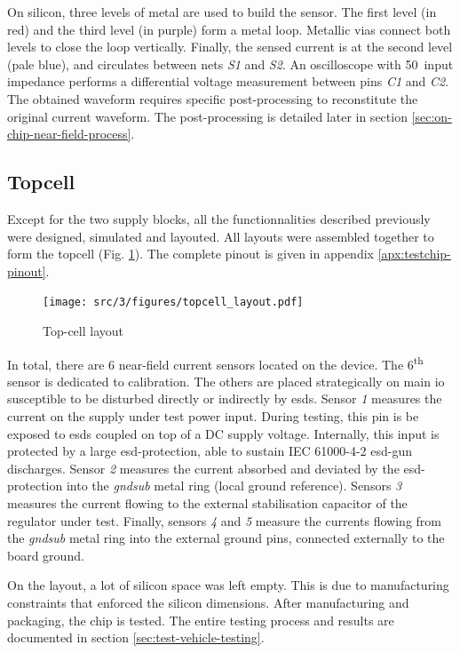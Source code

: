 On silicon, three levels of metal are used to build the sensor.
The first level (in red) and the third level (in purple) form a metal loop.
Metallic vias connect both levels to close the loop vertically.
Finally, the sensed current is at the second level (pale blue), and circulates between nets \textit{S1} and \textit{S2}.
An oscilloscope with 50\textOmega\ input impedance performs a differential voltage measurement between pins \textit{C1} and \textit{C2}.
The obtained waveform requires specific post-processing to reconstitute the original current waveform.
The post-processing is detailed later in section \ref{sec:on-chip-near-field-process}.

\subsection{Topcell}
Except for the two supply blocks, all the functionnalities described previously were designed, simulated and layouted.
All layouts were assembled together to form the topcell (Fig. \ref{fig:top-cell-layout}).
The complete pinout is given in appendix \ref{apx:testchip-pinout}.

\begin{figure}[!htbp]
  \centering
  \texttt{[image: src/3/figures/topcell\_layout.pdf]}
  \caption{Top-cell layout}
  \label{fig:top-cell-layout}
\end{figure}

In total, there are 6 near-field current sensors located on the device.
The 6\textsuperscript{th} sensor is dedicated to calibration.
The others are placed strategically on main \gls{io} susceptible to be disturbed directly or indirectly by \gls{esd}s.
Sensor \textit{1} measures the current on the supply under test power input.
During testing, this pin is be exposed to \gls{esd}s coupled on top of a DC supply voltage.
Internally, this input is protected by a large \gls{esd-protection}, able to sustain IEC 61000-4-2 \gls{esd-gun} discharges.
Sensor \textit{2} measures the current absorbed and deviated by the \gls{esd-protection} into the \textit{gndsub} metal ring (local ground reference).
Sensors \textit{3} measures the current flowing to the external stabilisation capacitor of the regulator under test.
Finally, sensors \textit{4} and \textit{5} measure the currents flowing from the \textit{gndsub} metal ring into the external ground pins, connected externally to the board ground.

On the layout, a lot of silicon space was left empty.
This is due to manufacturing constraints that enforced the silicon dimensions.
After manufacturing and packaging, the chip is tested.
The entire testing process and results are documented in section \ref{sec:test-vehicle-testing}.
